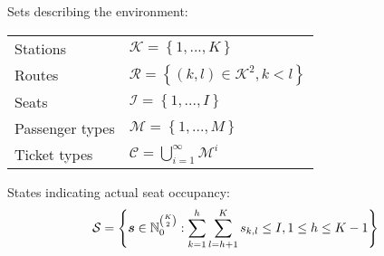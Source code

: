 Sets describing the environment:

\begin{center}
	\begin{tabular}{ll}
		Stations        & $\mathcal{K} = \left\{ 1, ..., K \right\}$ \\
		Routes          & $\mathcal{R} = \left\{ (k, l) \in \mathcal{K}^2, k < l \right\}$ \\
		Seats           & $\mathcal{I} = \left\{ 1, ..., I \right\}$ \\
		Passenger types & $\mathcal{M} = \left\{ 1, ..., M \right\}$ \\
		Ticket types    & $\mathcal{C} = \bigcup_{i=1}^{\infty} \mathcal{M}^i$ \\
	\end{tabular}
\end{center}

States indicating actual seat occupancy:
\[
	\mathcal{S} = \left\{ \bm{s} \in \mathbb{N}_0^{\binom{K}{2}}: \sum_{k=1}^h \sum_{l=h+1}^K s_{k,l} \leq I, 1 \leq h \leq K-1 \right\}
\]